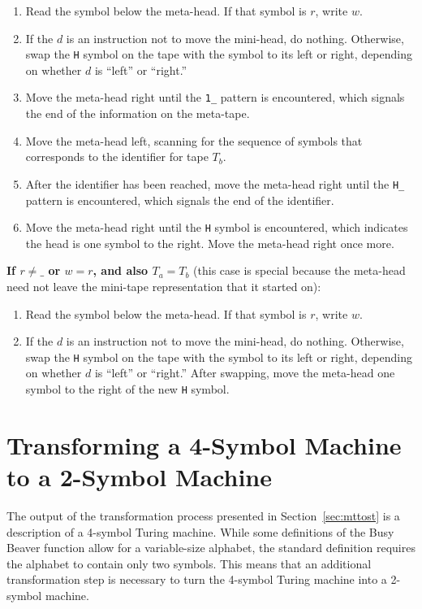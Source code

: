 \documentclass{report}
\begin{document}
\begin{enumerate}

\item Read the symbol below the meta-head. If that symbol is $r$, write $w$.
\item If the $d$ is an instruction not to move the mini-head, do nothing. Otherwise, swap the \texttt{H} symbol on the tape with the symbol to its left or right, depending on whether $d$ is ``left'' or ``right.''
\item Move the meta-head right until the \texttt{1\_} pattern is encountered, which signals the end of the information on the meta-tape.
\item Move the meta-head left, scanning for the sequence of symbols that corresponds to the identifier for tape $T_b$.
\item After the identifier has been reached, move the meta-head right until the \texttt{H\_} pattern is encountered, which signals the end of the identifier.
\item Move the meta-head right until the \texttt{H} symbol is encountered, which indicates the head is one symbol to the right. Move the meta-head right once more.

\end{enumerate}

\textbf{If $r \not= \texttt{\_}$ or $w = r$, and also $T_a = T_b$} (this case is special because the meta-head need not leave the mini-tape representation that it started on):
\begin{enumerate}

\item Read the symbol below the meta-head. If that symbol is $r$, write $w$.
\item If the $d$ is an instruction not to move the mini-head, do nothing. Otherwise, swap the \texttt{H} symbol on the tape with the symbol to its left or right, depending on whether $d$ is ``left'' or ``right.'' After swapping, move the meta-head one symbol to the right of the new \texttt{H} symbol.

\end{enumerate}

\section{Transforming a 4-Symbol Machine to a 2-Symbol Machine \label{sec:mstots}}

The output of the transformation process presented in Section~\ref{sec:mttost} is a description of a 4-symbol Turing machine. While some definitions of the Busy Beaver function allow for a variable-size alphabet, the standard definition requires the alphabet to contain only two symbols. This means that an additional transformation step is necessary to turn the 4-symbol Turing machine into a 2-symbol machine. \\
\end{document}
